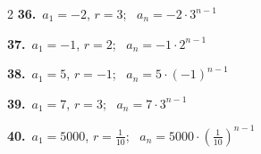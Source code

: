 \documentclass[11pt,letterpaper]{article}
\begin{document}
\begin{multicols}{2}
{\color{fmwatch}\bfseries 36.}\ $a_1=-2$, $r=3$; \ $a_n=-2\cdot 3^{n-1}$\par\vspace{2.2mm}
{\color{fmwatch}\bfseries 37.}\ $a_1=-1$, $r=2$; \ $a_n=-1\cdot 2^{n-1}$\par\vspace{2.2mm}
{\color{fmwatch}\bfseries 38.}\ $a_1=5$, $r=-1$; \ $a_n=5\cdot (-1)^{n-1}$\par\vspace{2.2mm}
{\color{fmwatch}\bfseries 39.}\ $a_1=7$, $r=3$; \ $a_n=7\cdot 3^{n-1}$\par\vspace{2.2mm}
{\color{fmwatch}\bfseries 40.}\ $a_1=5000$, $r=\tfrac{1}{10}$; \ $a_n=5000\cdot (\tfrac{1}{10})^{n-1}$\par\vspace{2.2mm}\end{multicols}
\end{document}
